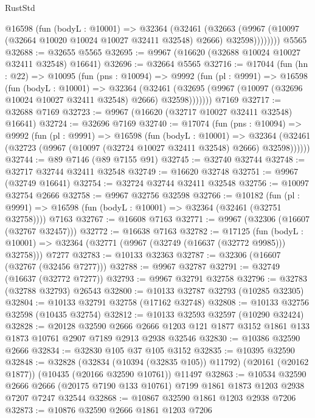 \begin{lexlean}{RustStd}
\begin{coremodule}
          @16598
            (fun (bodyL : @10001) =>
            @32364
              (@32461
                (@32663
                  (@9967 (@10097 (@32664 @10020 @10024 @10027 @32411 @32548) @2666) @32598))))))))
    @5565
@32688 := @32655 @5565
@32695 := @9967 (@16620 (@32688 @10024 @10027 @32411 @32548) @16641)
@32696 := @32664 @5565
@32716 := @17044
    (fun (hn : @22) =>
    @10095
      (fun (pns : @10094) =>
      @9992
        (fun (pl : @9991) =>
        @16598
          (fun (bodyL : @10001) =>
          @32364
            (@32461 (@32695 (@9967 (@10097 (@32696 @10024 @10027 @32411 @32548) @2666) @32598)))))))
    @7169
@32717 := @32688 @7169
@32723 := @9967 (@16620 (@32717 @10027 @32411 @32548) @16641)
@32724 := @32696 @7169
@32740 := @17074
    (fun (pns : @10094) =>
    @9992
      (fun (pl : @9991) =>
      @16598
        (fun (bodyL : @10001) =>
        @32364 (@32461 (@32723 (@9967 (@10097 (@32724 @10027 @32411 @32548) @2666) @32598))))))
@32744 := @89 @7146 (@89 @7155 @91)
@32745 := @32740 @32744
@32748 := @32717 @32744 @32411 @32548
@32749 := @16620 @32748
@32751 := @9967 (@32749 @16641)
@32754 := @32724 @32744 @32411 @32548
@32756 := @10097 @32754 @2666
@32758 := @9967 @32756 @32598
@32766 := @10182
    (fun (pl : @9991) => @16598 (fun (bodyL : @10001) => @32364 (@32461 (@32751 @32758))))
    @7163
@32767 := @16608 @7163
@32771 := @9967 (@32306 (@16607 (@32767 @32457)))
@32772 := @16638 @7163
@32782 := @17125
    (fun (bodyL : @10001) => @32364 (@32771 (@9967 (@32749 (@16637 (@32772 @9985))) @32758)))
    @7277
@32783 := @10133 @32363
@32787 := @32306 (@16607 (@32767 (@32456 @7277)))
@32788 := @9967 @32787
@32791 := @32749 (@16637 (@32772 @7277))
@32793 := @9967 @32791 @32758
@32796 := @32783 (@32788 @32793) @26543
@32800 := @10133 @32787 @32793 (@10285 @32305)
@32804 := @10133 @32791 @32758 (@17162 @32748)
@32808 := @10133 @32756 @32598 (@10435 @32754)
@32812 := @10133 @32593 @32597 (@10290 @32424)
@32828 := @20128
    @32590
    @2666
    @2666
    @1203
    @121
    @1877
    @3152
    @1861
    @133
    @1873
    @10761
    @2907
    @7189
    @2913
    @2938
    @32546
@32830 := @10386 @32590 @2666
@32834 := @32830 @105 @37 @105 @3152
@32835 := @10395 @32590
@32848 := @32828
    (@32834 (@10394 (@32835 @105)) @11792)
    (@20161 (@20162 @1877))
    (@10435 (@20166 @32590 @10761))
    @11497
@32863 := @10534
    @32590
    @2666
    @2666
    (@20175 @7190 @133 @10761)
    @7199
    @1861
    @1873
    @1203
    @2938
    @7207
    @7247
    @32544
@32868 := @10867 @32590 @1861 @1203 @2938 @7206
@32873 := @10876 @32590 @2666 @1861 @1203 @7206

\end{coremodule}
\end{lexlean}
